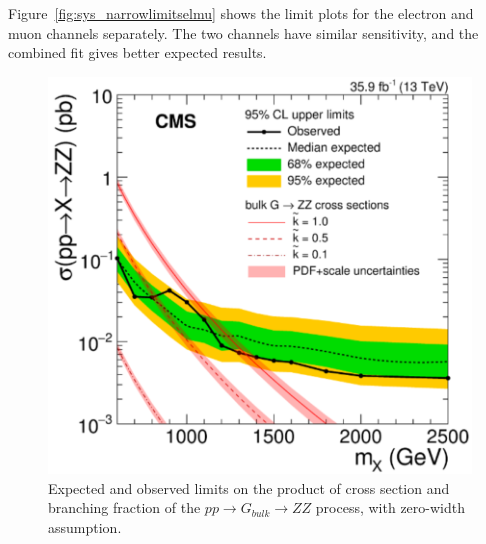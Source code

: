 \vspace{0.3cm}
Figure~\ref{fig:sys_narrowlimitselmu} shows the limit plots for the electron and muon channels separately. The two channels have similar sensitivity, and the combined fit gives better expected results.


\begin{figure}[htbp]
\begin{center}
\includegraphics[width=0.9\linewidth]{figures/sys_narrowlimit.png}
\caption{Expected and observed limits on the product of cross section and branching fraction of the $pp\rightarrow G_{bulk}\rightarrow ZZ$ process, with zero-width assumption.}
\label{fig:sys_narrowlimits}
\end{center}
\end{figure}

